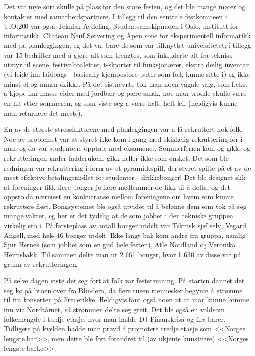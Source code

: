Det var mye som skulle på plass før den store festen, og det ble mange møter og kontakter med samarbeidspartnere. I tillegg til den sentrale festkomiteen i UiO:200 var også Teknisk Avdeling, Studentsamskipnaden i Oslo, Institutt for informatikk, Chateau Neuf Servering og Åpen sone for eksperimentell informatikk med på planleggingen, og det var bare de som var tilknyttet universitetet; i tillegg var 15 bedrifter med å gjøre alt som trengtes, som inkluderte alt fra teknisk utstyr til scene, festivaltoaletter, t-skjorter til funksjonærer, ekstra deilig inventar (vi leide inn laidbags - basically kjempestore puter som folk kunne sitte i) og ikke minst øl og annen drikke. På det sistnevnte tok man noen vågale valg, som f.eks. å kjøpe inn masse cider med jordbær og pære-smak, noe man trodde skulle være en hit etter sommeren, og som viste seg å være helt, helt feil (heldigvis kunne man returnere det meste).

En av de største stressfaktorene med planleggingen var å få rekruttert nok folk. Noe av problemet var at styret ikke kom i gang med skikkelig rekruttering før i mai, og da var studentene opptatt med eksamener. Sommerferien kom og gikk, og rekrutteringen under fadderukene gikk heller ikke som ønsket. Det som ble redningen var rekruttering i form av et pyramidespill, der styret spilte på et av de mest effektive betalingsmidlet for studenter - drikkebonger! Det ble designet slik at foreninger fikk flere bonger jo flere medlemmer de fikk til å delta, og det oppsto da nærmest en konkurranse mellom foreningene om hvem som kunne rekruttere flest. Bongsystemet ble også utvidet til å belønne dem som tok på seg mange vakter, og her er det tydelig at de som jobbet i den tekniske gruppen virkelig sto i. På førsteplass av antall bonger utdelt var Teknisk sjef selv, Vegard Angell, med hele 46 bonger utdelt. Ikke langt bak kom andre fra gruppa, nemlig Sjur Hernes (som jobbet som en gud hele festen), Atle Nordland og Veronika Heimsbakk. Til sammen delte man ut 2 061 bonger, hvor 1 630 av disse var på grunn av rekrutteringen.

På selve dagen viste det seg fort at folk var feststemning. På starten dannet det seg kø på broen over fra Blindern, da flere tusen mennesker begynte å strømme til fra konserten på Frederikke. Heldigvis fant også noen ut at man kunne komme inn via Nordtårnet, så strømmen delte seg greit. Det ble også en voldsom folkemengde i tredje etasje, hvor man hadde DJ Finanskrisa og fire barer. Tidligere på kvelden hadde man prøvd å promotere tredje etasje som <<Norges lengste bar>>, men dette ble fort forandret til (av ukjente kunstnere) <<Norges lengste barkø>>.

